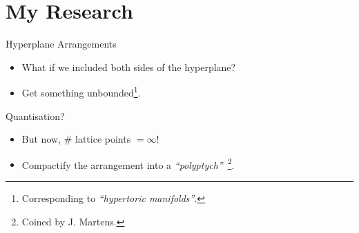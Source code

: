 \section{My Research}

\begin{frame}{Hyperplane Arrangements}

    \begin{itemize}
       \item What if we included both sides of the hyperplane?
       \item Get something unbounded\footnote{Corresponding to \emph{``hypertoric manifolds''}.}.
    \end{itemize}

\end{frame}

\begin{frame}{Quantisation?}

    \begin{itemize}
       \item But now, $\#$ lattice points $= \infty$!
       \item Compactify the arrangement into a \emph{``polyptych''}\, \footnote{Coined by J. Martens.}.
    \end{itemize}

\end{frame}